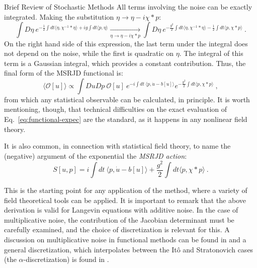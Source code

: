 \begin{chapter}{Brief Review of Stochastic Methods}
All terms involving the noise can be exactly integrated.
Making the substitution $\eta \to \eta - i \chi * p$:
\begin{equation}
    \int D\eta \
    e^{-\frac12 \int dt \langle \eta, \chi^{-1} * \eta \rangle
    + i g \int dt \langle p, \eta \rangle}
    \xrightarrow[\eta \to \eta - i \chi * p]{}
    \int D\eta \
    e^{-\frac{g^2}{2} \int dt \langle \eta, \chi^{-1} * \eta \rangle
    - \frac12 \int dt \langle p, \chi * p \rangle} \ .
\end{equation}
On the right hand side of this expression, the last term
under the integral does not depend on the noise, while the first
is quadratic on $\eta$.
The integral of this term is a Gaussian integral, which
provides a constant contribution.
Thus, the final form of the MSRJD functional is:
\begin{equation} \label{eq:functional-expec}
    \langle \mathcal{O}[u] \rangle \propto \int Du Dp \ \mathcal{O}[u] \
    e^{-i \int dt \ \langle p, \dot u - b[u] \rangle}
    e^{-\frac{g^2}{2} \int dt \langle p, \chi * p \rangle} \ ,
\end{equation}
from which any statistical observable can be calculated, in principle.
It is worth mentioning, though, that technical difficulties on the exact evaluation of Eq.~\eqref{eq:functional-expec} are the standard, as it happens in any nonlinear field theory.

It is also common, in connection with statistical field theory,
to name the (negative) argument of the exponential the \textit{MSRJD action}:
\begin{equation} \label{eq:msrjd}
    S[u,p] =
    i \int dt \ \langle p, \dot u - b[u] \rangle
    + \frac{g^2}{2} \int dt \langle p, \chi * p \rangle \ .
\end{equation}

This is the starting point for any application of the method,
where a variety of field theoretical tools can be applied.
It is important to remark that the above derivation is valid for Langevin equations with additive noise. In the case of multiplicative noise, the contribution of the Jacobian determinant must be carefully examined, and the choice of discretization is relevant for this. A discussion on multiplicative noise in functional methods can be found in \textcite{arenas2010} and a general discretization, which interpolates between the Itô and Stratonovich cases (the $\alpha$-discretization) is found in \textcite{janssen1992}.


\end{chapter}
